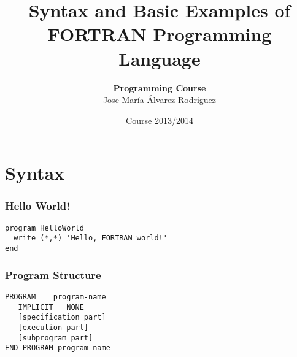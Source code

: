 \documentclass[xcolor=dvipsnames,dvip,notes=show,table]{beamer}
\title[FORTRAN]{Syntax and Basic Examples of FORTRAN Programming Language}
\author[Jose María Álvarez Rodríguez]{\textbf{Programming Course} \\ \vspace{0.3cm} Jose María Álvarez Rodríguez}
\subtitle{}
\institute{Department of Computer Science \\ Carlos III University of Madrid}
\date{Course 2013/2014}
\begin{document}
\frame{
\titlepage

}
% 
\frame{
\tableofcontents

}
% 
% 
\section{Syntax}
\begin{frame}[fragile]
\frametitle{Hello World!}

\begin{lstlisting}
program HelloWorld
  write (*,*) 'Hello, FORTRAN world!' 
end
\end{lstlisting}
\end{frame}

% 
\begin{frame}[fragile]
\frametitle{Program Structure}

\begin{lstlisting}
PROGRAM    program-name
   IMPLICIT   NONE
   [specification part]
   [execution part]
   [subprogram part]
END PROGRAM program-name
\end{lstlisting}
\end{frame}
\end{document}
